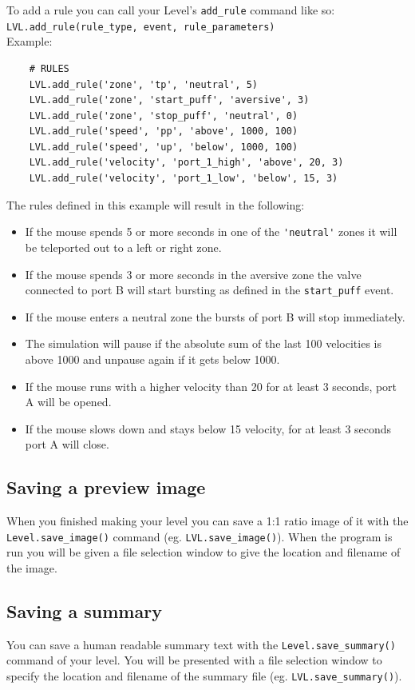 \documentclass[11pt,a4paper]{article}
\begin{document}
To add a rule you can call your Level's \texttt{add\_rule} command like so: \texttt{LVL.add\_rule(rule\_type, event, rule\_parameters)}\\


Example:
\begin{lstlisting}
	# RULES
	LVL.add_rule('zone', 'tp', 'neutral', 5)
	LVL.add_rule('zone', 'start_puff', 'aversive', 3)
	LVL.add_rule('zone', 'stop_puff', 'neutral', 0)
	LVL.add_rule('speed', 'pp', 'above', 1000, 100)
	LVL.add_rule('speed', 'up', 'below', 1000, 100)
	LVL.add_rule('velocity', 'port_1_high', 'above', 20, 3)
	LVL.add_rule('velocity', 'port_1_low', 'below', 15, 3)
\end{lstlisting}

The rules defined in this example will result in the following:
\begin{itemize}
\item If the mouse spends 5 or more seconds in one of the \lstinline{'neutral'} zones it will be teleported out to a left or right zone.
\item If the mouse spends 3 or more seconds in the aversive zone the valve connected to port B will start bursting as defined in the \texttt{start\_puff} event.
\item If the mouse enters a neutral zone the bursts of port B will stop immediately.
\item The simulation will pause if the absolute sum of the last 100 velocities is above 1000 and unpause again if it gets below 1000.
\item If the mouse runs with a higher velocity than 20 for at least 3 seconds, port A will be opened.
\item If the mouse slows down and stays below 15 velocity, for at least 3 seconds port A will close.
\end{itemize}

\subsection{Saving a preview image}
When you finished making your level you can save a 1:1 ratio image of it with the \texttt{Level.save\_image()} command (eg. \texttt{LVL.save\_image()}). When the program is run you will be given a file selection window to give the location and
filename of the image.

\subsection{Saving a summary}
You can save a human readable summary text with the \texttt{Level.save\_summary()} command of your level. You will be presented with a file selection window to specify the location and filename of the summary file (eg. \texttt{LVL.save\_summary()}).
\end{document}

